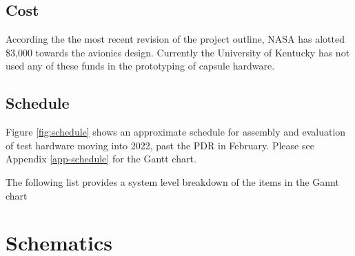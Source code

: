 \documentclass{article}
\begin{document}
\subsection{Cost}
According the the most recent revision of the project outline, NASA has alotted \$3,000 towards the avionics design. Currently the University of Kentucky has not used any of these funds in the prototyping of capsule hardware.


\subsection{Schedule}
Figure \ref{fig:schedule} shows an approximate schedule for assembly and evaluation of test hardware moving into 2022, past the PDR in February. Please see Appendix \ref{app-schedule} for the Gantt chart.

The following list provides a system level breakdown of the items in the Gannt chart




\appendix


\section{Schematics}
\label{appa}
\end{document}
